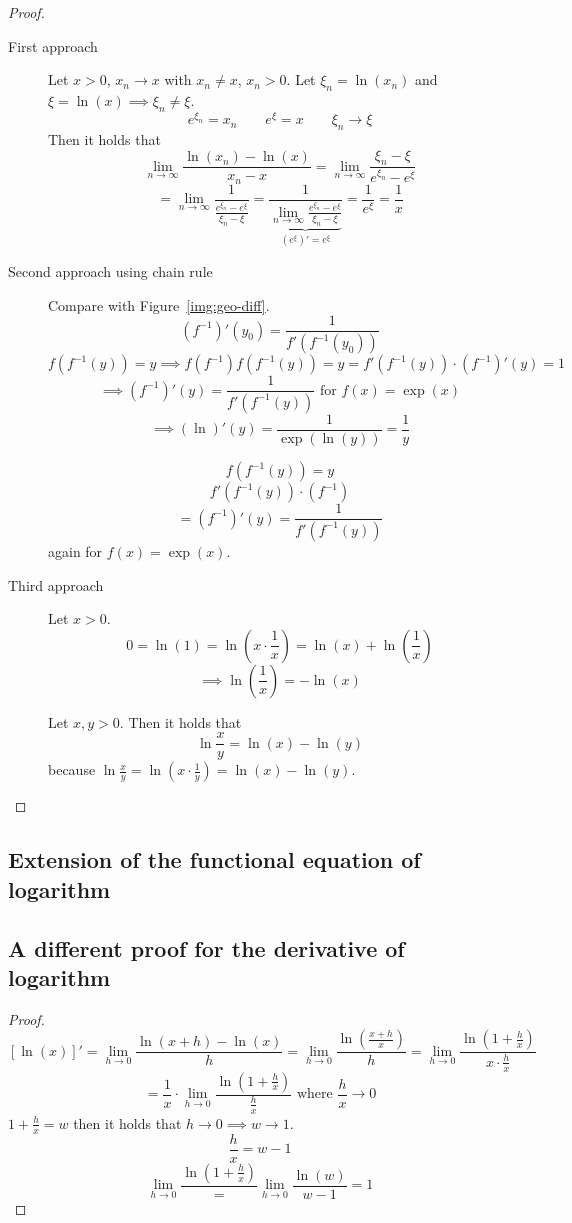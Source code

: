 \documentclass[a4paper,landscape,twocolumn]{article}
\theoremstyle{definition}
\begin{document}
\begin{proof}
  \begin{description}
    \item[First approach]
      Let $x > 0$, $x_n \to x$ with $x_n \neq x$, $x_n > 0$.
      Let $\xi_n = \ln(x_n)$ and $\xi = \ln(x) \implies \xi_n \neq \xi$.
      \[ e^{\xi_n} = x_n \qquad e^\xi = x \qquad \xi_n \to \xi \]
      Then it holds that
      \[ \lim_{n\to\infty} \frac{\ln(x_n) - \ln(x)}{x_n - x} = \lim_{n\to\infty} \frac{\xi_n - \xi}{e^{\xi_n} - e^\xi} \]
      \[
        = \lim_{n\to\infty} \frac{1}{\frac{e^{\xi_n} - e^\xi}{\xi_n - \xi}}
        = \frac{1}{\underbrace{\lim_{n\to\infty} \frac{e^{\xi_n} - e^\xi}{\xi_n - \xi}}_{(e^\xi)' = e^\xi}}
        = \frac1{e^\xi} = \frac1x
      \]
    \item[Second approach using chain rule]
      Compare with Figure~\ref{img:geo-diff}.
      \[ (f^{-1})'(y_0) = \frac{1}{f'(f^{-1}(y_0))} \]
      \[ f(f^{-1}(y)) = y \implies f(f^{-1}) f(f^{-1}(y)) = y = f'(f^{-1}(y)) \cdot (f^{-1})'(y) = 1 \]
      \[ \implies (f^{-1})'(y) = \frac{1}{f'(f^{-1}(y))} \text{ for } f(x) = \exp(x) \]
      \[ \implies (\ln)'(y) = \frac{1}{\exp(\ln(y))} = \frac{1}{y} \]

      \[ f(f^{-1}(y)) = y \]
      \[ f'(f^{-1}(y)) \cdot (f^{-1}) \]
      \[ = (f^{-1})'(y) = \frac{1}{f'(f^{-1}(y))} \]
      again for $f(x) = \exp(x)$.
    \item[Third approach]
      Let $x > 0$.
      \[ 0 = \ln(1) = \ln\left(x \cdot \frac1x\right) = \ln(x) + \ln\left(\frac1x\right) \]
      \[ \implies \ln\left(\frac1x\right) = -\ln(x) \]

      Let $x,y > 0$. Then it holds that
      \[ \ln{\frac{x}{y}} = \ln(x) - \ln(y) \]
      because $\ln\frac{x}{y} = \ln(x \cdot \frac1y) = \ln(x) - \ln(y)$.
  \end{description}
\end{proof}

\subsection{Extension of the functional equation of logarithm}
%


\subsection{A different proof for the derivative of logarithm}
%
\begin{proof}
  \[
    [\ln(x)]'
    = \lim_{h\to0} \frac{\ln(x + h) - \ln(x)}{h}
    = \lim_{h\to0} \frac{\ln\left(\frac{x+h}{x}\right)}{h}
    = \lim_{h\to0} \frac{\ln\left(1 + \frac{h}{x}\right)}{x \cdot \frac hx}
  \] \[
    = \frac1x \cdot \lim_{h\to0} \frac{\ln\left(1 + \frac{h}{x}\right)}{\frac{h}{x}}
    \text{ where } \frac hx \to 0
  \]
  $1 + \frac{h}{x} = w$ then it holds that $h \to 0 \implies w \to 1$.
  \[ \frac{h}{x} = w - 1 \]
  \[ \lim_{h\to0} \frac{\ln\left(1 + \frac{h}{x}\right)} = \lim_{h\to0} \frac{\ln(w)}{w - 1} = 1 \]
\end{proof}
\end{document}
